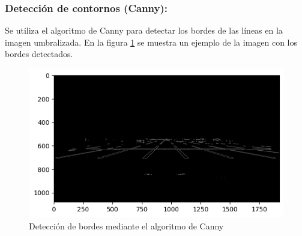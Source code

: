 \subsubsection{Detección de contornos (Canny):}
\noindent
Se utiliza el algoritmo de Canny \cite{canny1986edge} para detectar los bordes de las líneas en la imagen umbralizada.
En la figura \ref{fig:edges} se muestra un ejemplo de la imagen con los bordes detectados.
\begin{figure}[!ht]
    \centering
    \includegraphics[width=0.6  \textwidth]{img/reticule/canny}
    \caption{Detección de bordes mediante el algoritmo de Canny}
    \label{fig:edges}
\end{figure}


